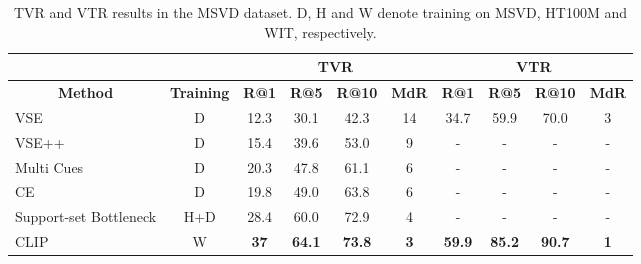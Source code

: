 \documentclass[a4paper,runningheads]{llncs}
\begin{document}
\begin{table}[ht!]
\centering
\begin{tabular}{lccccccccc}
\cmidrule(l){3-10}
                                                      & \multicolumn{1}{l}{} & \multicolumn{4}{c}{\textbf{TVR}}                   & \multicolumn{4}{c}{\textbf{VTR}}                   \\ \hline
\multicolumn{1}{c}{\textbf{Method}}                   & \textbf{Training}    & \textbf{R@1}  & \textbf{R@5}  & \textbf{R@10} & \textbf{MdR} & \textbf{R@1}  & \textbf{R@5}  & \textbf{R@10} & \textbf{MdR} \\ \hline
VSE   \cite{Mithun2018MultimodalCuesVSE}              & D                    & 12.3          & 30.1          & 42.3          & 14           & 34.7          & 59.9          & 70.0          & 3            \\
VSE++ \cite{Mithun2018MultimodalCuesVSE}              & D                    & 15.4          & 39.6          & 53.0          & 9            & -             & -             & -             & -            \\
Multi Cues   \cite{Mithun2018MultimodalCuesVSE}       & D                    & 20.3          & 47.8          & 61.1          & 6            & -             & -             & -             & -            \\
CE \cite{Liu2020CE}                                   & D                    & 19.8          & 49.0          & 63.8          & 6            & -             & -             & -             & -            \\
Support-set Bottleneck   \cite{Patrick2021supportset} & H+D                  & 28.4          & 60.0          & 72.9 & 4            & -             & -             & -             & -            \\ \hline
CLIP                                                  & W                    & \textbf{37} & \textbf{64.1} & \textbf{73.8}          & \textbf{3}   & \textbf{59.9} & \textbf{85.2} & \textbf{90.7} & \textbf{1}   \\ \hline
\end{tabular}
\caption{TVR and VTR results in the MSVD dataset. D, H and W denote training on MSVD, HT100M and WIT, respectively.}
\label{table:BigMSVD}
\end{table}
\end{document}
